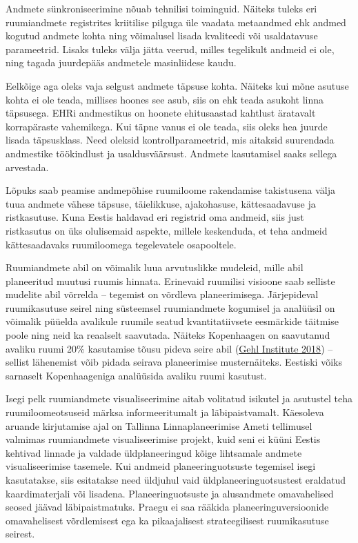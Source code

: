 \documentclass[estonian,]{article}
\begin{document}
Andmete sünkroniseerimine nõuab tehnilisi toiminguid. Näiteks tuleks eri ruumiandmete registrites kriitilise pilguga üle vaadata metaandmed ehk andmed kogutud andmete kohta ning võimalusel lisada kvaliteedi või usaldatavuse parameetrid. Lisaks tuleks välja jätta veerud, milles tegelikult andmeid ei ole, ning tagada juurdepääs andmetele masinliidese kaudu.

Eelkõige aga oleks vaja selgust andmete täpsuse kohta. Näiteks kui mõne asutuse kohta ei ole teada, millises hoones see asub, siis on ehk teada asukoht linna täpsusega. EHRi andmestikus on hoonete ehitusaastad kahtlust äratavalt korrapäraste vahemikega. Kui täpne vanus ei ole teada, siis oleks hea juurde lisada täpsusklass. Need oleksid kontrollparameetrid, mis aitaksid suurendada andmestike töökindlust ja usaldusväärsust. Andmete kasutamisel saaks sellega arvestada.

Lõpuks saab peamise andmepõhise ruumiloome rakendamise takistusena välja tuua andmete vähese täpsuse, täielikkuse, ajakohasuse, kättesaadavuse ja ristkasutuse. Kuna Eestis haldavad eri registrid oma andmeid, siis just ristkasutus on üks olulisemaid aspekte, millele keskenduda, et teha andmeid kättesaadavaks ruumiloomega tegelevatele osapooltele.

Ruumiandmete abil on võimalik luua arvutuslikke mudeleid, mille abil planeeritud muutusi ruumis hinnata. Erinevaid ruumilisi visioone saab selliste mudelite abil võrrelda -- tegemist on võrdleva planeerimisega. Järjepideval ruumikasutuse seirel ning süsteemsel ruumiandmete kogumisel ja analüüsil on võimalik püüelda avalikule ruumile seatud kvantitatiivsete eesmärkide täitmise poole ning neid ka reaalselt saavutada. Näiteks Kopenhaagen on saavutanud avaliku ruumi 20\% kasutamise tõusu pideva seire abil (\protect\hyperlink{Gehl2018}{Gehl Institute 2018}) -- sellist lähenemist võib pidada seirava planeerimise musternäiteks. Eestiski võiks sarnaselt Kopenhaageniga analüüsida avaliku ruumi kasutust.

Isegi pelk ruumiandmete visualiseerimine aitab volitatud isikutel ja asutustel teha ruumiloomeotsuseid märksa informeeritumalt ja läbipaistvamalt. Käesoleva aruande kirjutamise ajal on Tallinna Linnaplaneerimise Ameti tellimusel valmimas ruumiandmete visualiseerimise projekt, kuid seni ei küüni Eestis kehtivad linnade ja valdade üldplaneeringud kõige lihtsamale andmete visualiseerimise tasemele. Kui andmeid planeeringuotsuste tegemisel isegi kasutatakse, siis esitatakse need üldjuhul vaid üldplaneeringuotsustest eraldatud kaardimaterjali või lisadena. Planeeringuotsuste ja alusandmete omavahelised seosed jäävad läbipaistmatuks. Praegu ei saa rääkida planeeringuversioonide omavahelisest võrdlemisest ega ka pikaajalisest strateegilisest ruumikasutuse seirest.
\end{document}
